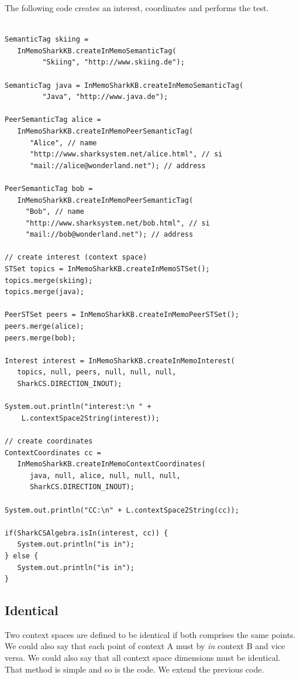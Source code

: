 The following code creates an interest, coordinates and performs the test.

\begin{verbatim}

SemanticTag skiing =
   InMemoSharkKB.createInMemoSemanticTag(
         "Skiing", "http://www.skiing.de");

SemanticTag java = InMemoSharkKB.createInMemoSemanticTag(
         "Java", "http://www.java.de");

PeerSemanticTag alice =
   InMemoSharkKB.createInMemoPeerSemanticTag(
      "Alice", // name
      "http://www.sharksystem.net/alice.html", // si
      "mail://alice@wonderland.net"); // address

PeerSemanticTag bob =
   InMemoSharkKB.createInMemoPeerSemanticTag(
     "Bob", // name
     "http://www.sharksystem.net/bob.html", // si
     "mail://bob@wonderland.net"); // address

// create interest (context space)
STSet topics = InMemoSharkKB.createInMemoSTSet();
topics.merge(skiing);
topics.merge(java);

PeerSTSet peers = InMemoSharkKB.createInMemoPeerSTSet();
peers.merge(alice);
peers.merge(bob);

Interest interest = InMemoSharkKB.createInMemoInterest(
   topics, null, peers, null, null, null,
   SharkCS.DIRECTION_INOUT);

System.out.println("interest:\n " +
    L.contextSpace2String(interest));

// create coordinates
ContextCoordinates cc =
   InMemoSharkKB.createInMemoContextCoordinates(
      java, null, alice, null, null, null,
      SharkCS.DIRECTION_INOUT);

System.out.println("CC:\n" + L.contextSpace2String(cc));

if(SharkCSAlgebra.isIn(interest, cc)) {
   System.out.println("is in");
} else {
   System.out.println("is in");
}
\end{verbatim}

\subsection{Identical}
Two context spaces are defined to be identical if both comprises the same points.
We could also say that each point of context A must by {\it in} context B and vice versa. We could also say that all context space dimensions must be identical. That method is simple and so is the code. We extend the previous code.

